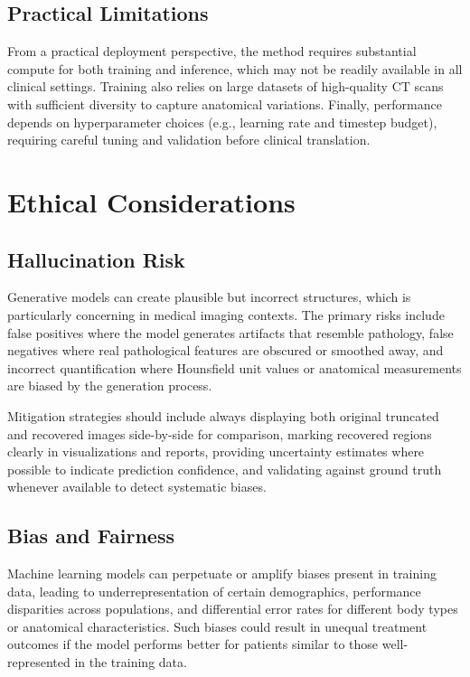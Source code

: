 \subsection{Practical Limitations}

From a practical deployment perspective, the method requires substantial compute for both training and inference, which may not be readily available in all clinical settings. Training also relies on large datasets of high-quality CT scans with sufficient diversity to capture anatomical variations. Finally, performance depends on hyperparameter choices (e.g., learning rate and timestep budget), requiring careful tuning and validation before clinical translation.

\section{Ethical Considerations}

\subsection{Hallucination Risk}

Generative models can create plausible but incorrect structures, which is particularly concerning in medical imaging contexts. The primary risks include false positives where the model generates artifacts that resemble pathology, false negatives where real pathological features are obscured or smoothed away, and incorrect quantification where Hounsfield unit values or anatomical measurements are biased by the generation process.

Mitigation strategies should include always displaying both original truncated and recovered images side-by-side for comparison, marking recovered regions clearly in visualizations and reports, providing uncertainty estimates where possible to indicate prediction confidence, and validating against ground truth whenever available to detect systematic biases.

\subsection{Bias and Fairness}

Machine learning models can perpetuate or amplify biases present in training data, leading to underrepresentation of certain demographics, performance disparities across populations, and differential error rates for different body types or anatomical characteristics. Such biases could result in unequal treatment outcomes if the model performs better for patients similar to those well-represented in the training data.

